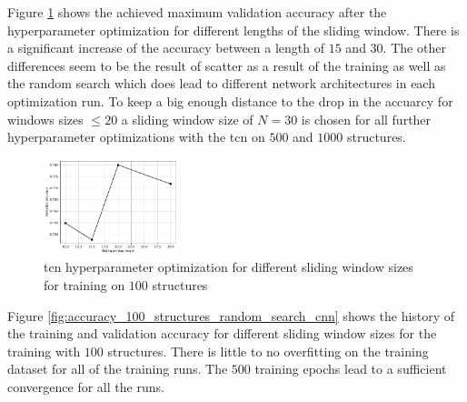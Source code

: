 \documentclass[conference]{IEEEtran}
\begin{document}
Figure \ref{fig:influence_sequence_length_tcn} shows the achieved maximum validation accuracy after the hyperparameter optimization for different lengths of the sliding window. There is a significant increase of the accuracy between a length of $ 15 $ and $ 30 $. The other differences seem to be the result of scatter as a result of the training as well as the random search which does lead to different network architectures in each optimization run. To keep a big enough distance to the drop in the accuarcy for windows sizes $ \leq 20 $ a sliding window size of $ N = 30 $ is chosen for all further hyperparameter optimizations with the \gls{tcn} on $ 500 $ and $ 1000 $ structures.

\begin{figure}[htp]
	\centering
	\includegraphics[width=0.35\textwidth]{python/influence_sequence_length_tcn.pdf}
	\caption{\gls{tcn} hyperparameter optimization for different sliding window sizes for training on $ 100 $ structures}
	\label{fig:influence_sequence_length_tcn}
\end{figure}

Figure \ref{fig:accuracy_100_structures_random_search_cnn} shows the history of the training and validation accuracy for different sliding window sizes for the training with $ 100 $ structures. There is little to no overfitting on the training dataset for all of the training runs. The $ 500 $ training epochs lead to a sufficient convergence for all the runs.
\end{document}
